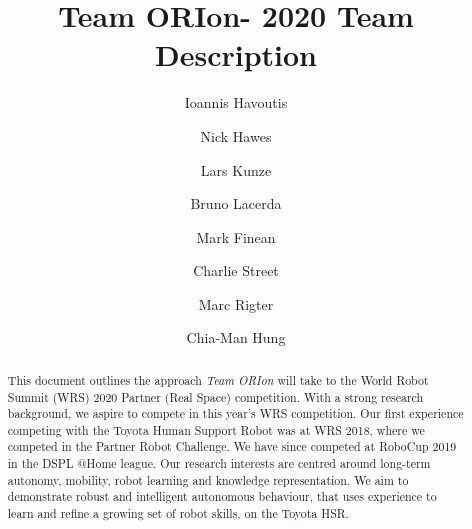 \documentclass[runningheads,a4paper]{llncs}
\newcommand{\teamori}{Team ORIon}
\begin{document}

\title{\teamori - 2020 Team Description}

\author{Ioannis Havoutis \and Nick Hawes \and Lars Kunze \and Bruno Lacerda 
\and Mark Finean \and Charlie Street \and Marc Rigter \and Chia-Man Hung}

\maketitle


\begin{abstract}
This document outlines the approach \textit{\teamori} will take to the 
World Robot Summit (WRS) 2020 Partner (Real Space) competition. 
With a strong research background, we aspire to compete 
in this year's WRS competition. Our first experience competing with the Toyota Human 
Support Robot was at WRS 2018, where we competed in the Partner 
Robot Challenge. We have since competed at RoboCup 2019 in the DSPL @Home league.
Our research interests are centred around long-term
autonomy, mobility, robot learning and knowledge representation. 
We aim to demonstrate robust and intelligent autonomous behaviour, that uses
experience to learn and refine a growing set of robot skills, on the Toyota
HSR.
\end{abstract}


\end{document}

